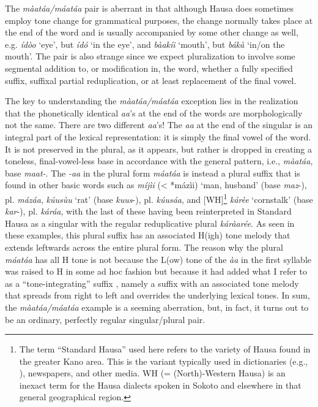 \documentclass[output=paper,colorlinks,citecolor=brown]{langscibook}
\begin{document}
The \textit{màatáa/máatáa} pair  is aberrant in that although Hausa does sometimes employ tone change for grammatical purposes, the change normally takes place at the end of the word and is usually accompanied by some other change as well, e.g. \textit{ídòo} `eye’, but \textit{ídó} `in the eye’, and \textit{bàakíi} `mouth’, but \textit{bákà} `in/on the mouth'. The pair is also strange since we expect pluralization to involve some segmental addition to, or modification in, the word, whether a fully specified suffix, suffixal partial reduplication, or at least replacement of the final vowel.

The key to understanding the \textit{màatáa/máatáa} exception lies in the realization that the phonetically identical \textit{aa}’s at the end of the words are morphologically not the same. There are two different \textit{aa}’s! The \textit{aa} at the end of the singular is an integral part of the lexical representation: it is simply the final vowel of the word. It is not preserved in the plural, as it appears, but rather is dropped in creating a toneless, final-vowel-less base in accordance with the general pattern, i.e., \textit{màatáa}, base \textit{maat-}. The \textit{-aa} in the plural form \textit{máatáa} is instead a plural suffix that is found in other basic words such as \textit{míjìi} (< *mázìi) `man, husband’ (base \textit{maz}-), pl. \textit{mázáa}, \textit{kúusùu} `rat’ (base \textit{kuus}-), pl. \textit{kúusáa}, and [WH]\footnote{The term ``Standard Hausa” used here refers to the variety of Hausa found in the greater Kano area. This is the  variant typically used in dictionaries (e.g., \citealt{NewmanNewman2020}), newspapers, and other media. WH (= (North)-Western Hausa) is an inexact term for the Hausa dialects spoken in Sokoto and elsewhere in that general geographical region.} \textit{kárèe} `cornstalk’ (base \textit{kar}-), pl. \textit{káráa}, with the last of these having been reinterpreted in Standard Hausa as a singular with the regular reduplicative  plural \textit{káràarée}.  As seen in these examples, this plural suffix has an associated H(igh) tone melody that extends leftwards across the entire plural form. The reason why the plural \textit{máatáa} has all H tone is not because the L(ow) tone of the \textit{àa} in the first syllable was raised to H in some ad hoc fashion but because it had added what I refer to as  a ``tone-integrating” suffix \citep{Newman1986}, namely a suffix with an associated tone melody that spreads from right to left and overrides  the underlying lexical tones. In sum, the \textit{màatáa/máatáa} example is a seeming aberration, but, in fact, it turns out to be an ordinary, perfectly regular singular/plural pair.
\end{document}
